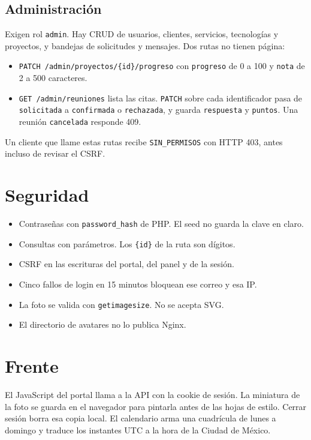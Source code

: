 \subsection{Administración}

Exigen rol \texttt{admin}. Hay CRUD de usuarios, clientes, servicios,
tecnologías y proyectos, y bandejas de solicitudes y mensajes. Dos rutas no
tienen página:

\begin{itemize}
  \item \texttt{PATCH /admin/proyectos/\{id\}/progreso} con \texttt{progreso}
        de 0 a 100 y \texttt{nota} de 2 a 500 caracteres.
  \item \texttt{GET /admin/reuniones} lista las citas.
        \texttt{PATCH} sobre cada identificador pasa de \texttt{solicitada}
        a \texttt{confirmada} o \texttt{rechazada}, y guarda
        \texttt{respuesta} y \texttt{puntos}.
        Una reunión \texttt{cancelada} responde 409.
\end{itemize}

Un cliente que llame estas rutas recibe \texttt{SIN\_PERMISOS} con HTTP 403,
antes incluso de revisar el CSRF.

\section{Seguridad}

\begin{itemize}
  \item Contraseñas con \texttt{password\_hash} de PHP. El seed no guarda la clave en claro.
  \item Consultas con parámetros. Los \texttt{\{id\}} de la ruta son dígitos.
  \item CSRF en las escrituras del portal, del panel y de la sesión.
  \item Cinco fallos de login en 15 minutos bloquean ese correo y esa IP.
  \item La foto se valida con \texttt{getimagesize}. No se acepta SVG.
  \item El directorio de avatares no lo publica Nginx.
\end{itemize}

\section{Frente}

El JavaScript del portal llama a la API con la cookie de sesión. La miniatura
de la foto se guarda en el navegador para pintarla antes de las hojas de
estilo. Cerrar sesión borra esa copia local. El calendario arma una cuadrícula
de lunes a domingo y traduce los instantes UTC a la hora de la Ciudad de México.


